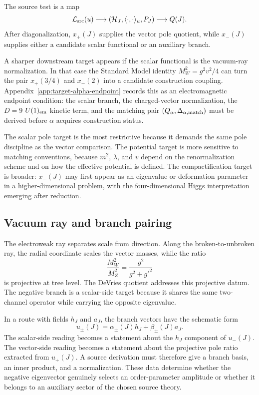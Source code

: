 The source test is a map
\begin{equation}
  \mathcal L_{\rm src}(u)
  \longrightarrow
  (\mathcal H_J,\langle\cdot,\cdot\rangle_u,P_J)
  \longrightarrow Q(J).
  \label{eq:negative-source-diagram}
\end{equation}
After diagonalization, \(x_+(J)\) supplies the vector pole quotient, while
\(x_-(J)\) supplies either a candidate scalar functional or an auxiliary
branch.

A sharper downstream target appears if the scalar functional is the
vacuum-ray normalization.  In that case the Standard Model identity
\(M_W^2=g^2v^2/4\) can turn the pair \(x_+(3/4)\) and \(x_-(2)\) into a
candidate construction coupling.  Appendix~\ref{app:target-alpha-endpoint}
records this as an electromagnetic endpoint condition: the scalar branch,
the charged-vector normalization, the \(D=9\) \(U(1)_{\rm em}\) kinetic term,
and the matching pair \((Q_\alpha,\Delta_{\alpha,{\rm match}})\) must be
derived before \(\alpha\) acquires construction status.

The scalar pole target is the most restrictive because it demands the same pole discipline as the vector comparison.  The potential target is more sensitive to matching conventions, because \(m^2\), \(\lambda\), and \(v\) depend on the renormalization scheme and on how the effective potential is defined.  The compactification target is broader: \(x_-(J)\) may first appear as an eigenvalue or deformation parameter in a higher-dimensional problem, with the four-dimensional Higgs interpretation emerging after reduction.

\subsection{Vacuum ray and branch pairing}
\label{sec:vacuum-ray-branch-pairing}

The electroweak ray separates scale from direction.  Along the broken-to-unbroken ray, the radial coordinate scales the vector masses, while the ratio
\begin{equation}
  \frac{M_W^2}{M_Z^2}
  =
  \frac{g^2}{g^2+g'^2}
  \label{eq:negative-vector-projector}
\end{equation}
is projective at tree level.  The DeVries quotient addresses this projective datum.  The negative branch is a scalar-side target because it shares the same two-channel operator while carrying the opposite eigenvalue.

In a route with fields \(h_J\) and \(a_J\), the branch vectors have the schematic form
\begin{equation}
  u_{\pm}(J)=\alpha_\pm(J)h_J+\beta_\pm(J)a_J.
  \label{eq:negative-branch-mixture}
\end{equation}
The scalar-side reading becomes a statement about the \(h_J\) component of \(u_-(J)\).  The vector-side reading becomes a statement about the projective pole ratio extracted from \(u_+(J)\).  A source derivation must therefore give a branch basis, an inner product, and a normalization.  These data determine whether the negative eigenvector genuinely selects an order-parameter amplitude or whether it belongs to an auxiliary sector of the chosen source theory.

